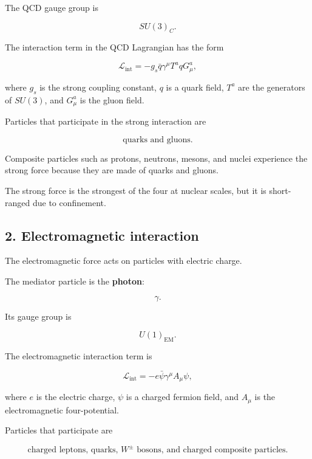\documentclass[12pt]{article}
\begin{document}
The QCD gauge group is

\begin{equation}
SU(3)_C.
\end{equation}

The interaction term in the QCD Lagrangian has the form

\begin{equation}
\mathcal{L}_{\text{int}}=-g_s\bar{q}\gamma^\mu T^a qG^a_\mu,
\end{equation}

where $g_s$ is the strong coupling constant, $q$ is a quark field, $T^a$ are the generators of $SU(3)$, and $G^a_\mu$ is the gluon field.

Particles that participate in the strong interaction are

\[
\text{quarks and gluons.}
\]

Composite particles such as protons, neutrons, mesons, and nuclei experience the strong force because they are made of quarks and gluons.

The strong force is the strongest of the four at nuclear scales, but it is short-ranged due to confinement.

\subsection*{2. Electromagnetic interaction}

The electromagnetic force acts on particles with electric charge.

The mediator particle is the \textbf{photon}:

\[
\gamma.
\]

Its gauge group is

\begin{equation}
U(1)_{\text{EM}}.
\end{equation}

The electromagnetic interaction term is

\begin{equation}
\mathcal{L}_{\text{int}}=-e\bar{\psi}\gamma^\mu A_\mu\psi,
\end{equation}

where $e$ is the electric charge, $\psi$ is a charged fermion field, and $A_\mu$ is the electromagnetic four-potential.

Particles that participate are

\[
\text{charged leptons, quarks, } W^\pm \text{ bosons, and charged composite particles.}
\]
\end{document}
